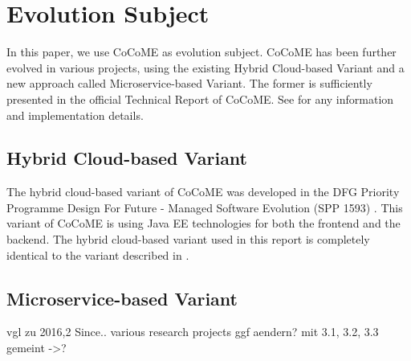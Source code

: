 \section{Evolution Subject}
In this paper, we use CoCoME as evolution subject. CoCoME has been further evolved in various projects, using the existing Hybrid Cloud-based Variant and a new approach called Microservice-based Variant. The former is sufficiently presented in the official Technical Report of CoCoME. See \cite{SWB-469002735} for any information and implementation details.
\subsection{Hybrid Cloud-based Variant}
The hybrid cloud-based variant of CoCoME was developed in the DFG Priority Programme
Design For Future - Managed Software Evolution (SPP 1593) \cite{Goltz2015}. This variant of CoCoME is using Java EE technologies for both the frontend and the backend. The hybrid cloud-based variant used in this report is completely identical to the variant described in \cite{SWB-469002735}. 

\subsection{Microservice-based Variant}
vgl zu 2016,2 Since.. various research projects ggf aendern?
mit 3.1, 3.2, 3.3 gemeint ->?